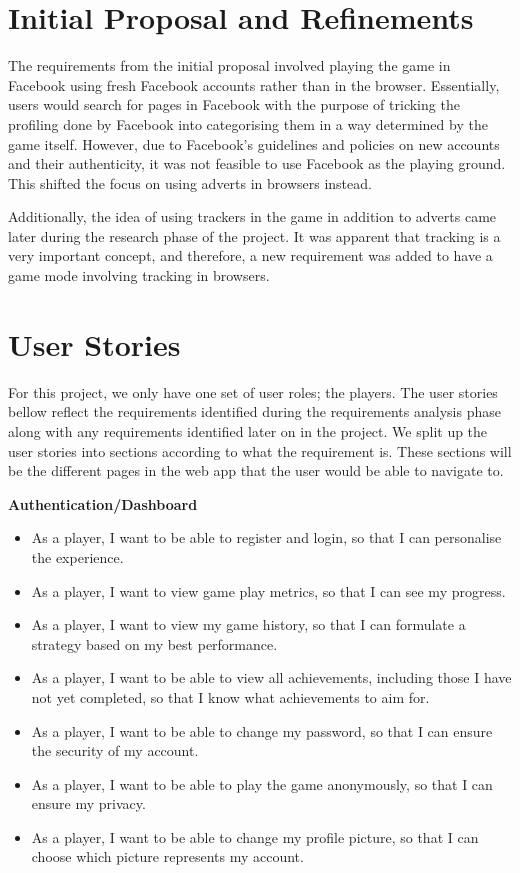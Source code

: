 \documentclass{l4proj}
\begin{document}
\section{Initial Proposal and Refinements}
The requirements from the initial proposal involved playing the game in Facebook using fresh Facebook accounts rather than in the browser. Essentially, users would search for pages in Facebook with the purpose of tricking the profiling done by Facebook into categorising them in a way determined by the game itself. However, due to Facebook's guidelines and policies on new accounts and their authenticity, it was not feasible to use Facebook as the playing ground. This shifted the focus on using adverts in browsers instead.

Additionally, the idea of using trackers in the game in addition to adverts came later during the research phase of the project. It was apparent that tracking is a very important concept, and therefore, a new requirement was added to have a game mode involving tracking in browsers.

\section{User Stories}
For this project, we only have one set of user roles; the players. The user stories bellow reflect the requirements identified during the requirements analysis phase along with any requirements identified later on in the project. We split up the user stories into sections according to what the requirement is. These sections will be the different pages in the web app that the user would be able to navigate to.

\textbf{Authentication/Dashboard}
\begin{itemize}
    \item As a player, I want to be able to register and login, so that I can personalise the experience.
    \item As a player, I want to view game play metrics, so that I can see my progress.
    \item As a player, I want to view my game history, so that I can formulate a strategy based on my best performance.
    \item As a player, I want to be able to view all achievements, including those I have not yet completed, so that I know what achievements to aim for.
    \item As a player, I want to be able to change my password, so that I can ensure the security of my account.
    \item As a player, I want to be able to play the game anonymously, so that I can ensure my privacy.
    \item As a player, I want to be able to change my profile picture, so that I can choose which picture represents my account.
\end{itemize}
\end{document}
